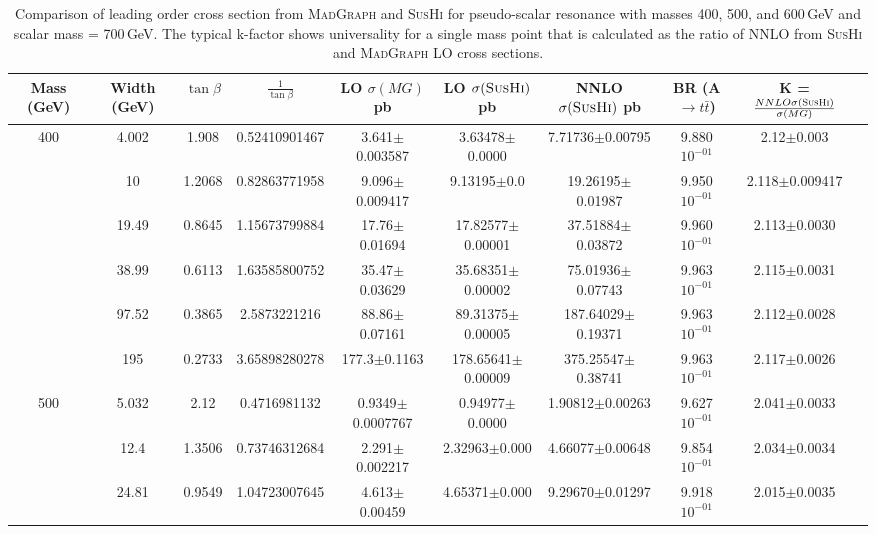 \begin{landscape}
\begin{table}[ht]
\caption{Comparison of leading order cross section from \textsc{MadGraph} and \textsc{SusHi} for pseudo-scalar resonance with masses 400, 500, and 600\,GeV and scalar mass = 700\,GeV. The typical k-factor shows universality for a single mass point that is calculated as the ratio of NNLO from \textsc{SusHi} and \textsc{MadGraph} LO cross sections.}
\centering
\begin{tabular}{| c | c | c | c | c | c | c | c | c | c |}
\hline\hline
Mass (GeV) & Width (GeV) & $\tan\beta$ & $\frac{1}{\tan\beta}$ & LO $\sigma(MG)$ pb & LO $\sigma(\textsc{SusHi})$ pb & NNLO $\sigma(\textsc{SusHi})$ pb & BR (A$\rightarrow t\bar{t}$) & K = $\frac{NNLO \sigma(\textsc{SusHi})}{\sigma(MG)}$ \\ 
\hline\hline
\multirow {6}{*}{400}& 4.002 & 1.908 &  0.52410901467 & 3.641$\pm$0.003587 &  3.63478$\pm$0.0000 & 7.71736$\pm$0.00795 & 9.880$10^{-01}$ & 2.12$\pm$0.003\\
\cline{2-9}
& 10 & 1.2068 & 0.82863771958 & 9.096$\pm$0.009417 & 9.13195$\pm$0.0 & 19.26195$\pm$0.01987 & 9.950$10^{-01}$ & 2.118$\pm$0.009417\\
\cline{2-9}
& 19.49 & 0.8645 & 1.15673799884 & 17.76$\pm$0.01694 & 17.82577$\pm$0.00001 & 37.51884$\pm$0.03872 & 9.960$10^{-01}$ & 2.113$\pm$0.0030\\
\cline{2-9}
& 38.99 & 0.6113 & 1.63585800752 & 35.47$\pm$0.03629 & 35.68351$\pm$0.00002 & 75.01936$\pm$0.07743 & 9.963$10^{-01}$ & 2.115$\pm$0.0031\\
\cline{2-9}
& 97.52 & 0.3865 & 2.5873221216 & 88.86$\pm$0.07161 & 89.31375$\pm$0.00005 & 187.64029$\pm$0.19371 & 9.963$10^{-01}$ & 2.112$\pm$0.0028\\
\cline{2-9}
& 195 & 0.2733 & 3.65898280278 & 177.3$\pm$0.1163 & 178.65641$\pm$0.00009 & 375.25547$\pm$0.38741 & 9.963$10^{-01}$ & 2.117$\pm$0.0026\\
\hline \hline
\multirow {6}{*}{500} & 5.032 & 2.12 & 0.4716981132 & 0.9349$\pm$0.0007767 & 0.94977$\pm$0.0000 & 1.90812$\pm$0.00263 & 9.627$10^{-01}$ & 2.041$\pm$0.0033\\
\cline{2-9}
&12.4 & 1.3506 & 0.73746312684 & 2.291$\pm$0.002217 & 2.32963$\pm$0.000 & 4.66077$\pm$0.00648 &9.854$10^{-01}$ & 2.034$\pm$0.0034\\
\cline{2-9}
&24.81 & 0.9549 & 1.04723007645 & 4.613$\pm$0.00459 & 4.65371$\pm$0.000 & 9.29670$\pm$0.01297 & 9.918$10^{-01}$ & 2.015$\pm$0.0035\\

\end{tabular}
\end{table}
\end{landscape}
